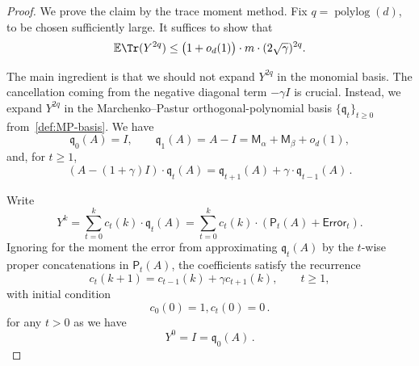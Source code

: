 \documentclass[12pt]{article}
\def \E {\mathbb{E}}
\def \al {\alpha}
\newcommand{\polylog}{\operatorname{polylog}}
\newcommand{\cm}{\mathsf{M} }
\newcommand{\fp}{\mathsf{P}}
\newcommand{\q}{\mathfrak q}
\newcommand{\Authornote}[3]{{\sf\footnotesize\color{#3}{[#1: #2]}}}
\newcommand{\Authornote}[3]{}
\newcommand{\jnote}[1]{\Authornote{Jeff}{#1}{blue}}
\begin{document}
\begin{proof}
	
We prove the claim by the trace moment method. Fix
\(q=\polylog(d)\), to be chosen sufficiently large. It suffices to show that
\[
    \E\Tr(Y^{2q})
    \le
    \bigl(1+o_d(1)\bigr) \cdot  m \cdot (2\sqrt{\gamma})^{2q}.
\]


The main ingredient is that we should not expand \(Y^{2q}\) in the 
monomial basis. The cancellation coming from the negative diagonal term
\(-\gamma I\) is crucial. Instead, we expand \(Y^{2q}\) in the Marchenko–Pastur orthogonal-polynomial basis \(\{\q_t\}_{t\ge0}\) from~\cref{def:MP-basis}. We have \[
    \q_0(A)=I,
    \qquad
    \q_1(A)=A- I=\cm_\al + \cm_\beta + o_d(1),
\]
and, for \(t\ge1\),
\[
    (A - (1+\gamma) I)  \cdot  \q_t(A)
    =
    \q_{t+1}(A)+\gamma  \cdot \q_{t-1}(A)\,.\]

Write
\[
    Y^k
    =
    \sum_{t=0}^{k} c_t(k) \cdot \q_t(A)  = \sum_{t=0}^k c_t(k) \cdot \left(\fp_t(A)+ \mathsf{Error}_t\right).
\]
Ignoring for the moment the error from approximating $\q_t(A)$ by the $t$-wise proper concatenations in $\fp_t(A)$, the coefficients
satisfy the recurrence
\[
    c_t(k+1)
    =
    c_{t-1}(k)+\gamma c_{t+1}(k),
    \qquad t\ge1,
\]
with
initial condition
\[
    c_0(0)=1,
    c_t(0) =0 \,.
\]
for any $t>0$ as we have \[ 
Y^0 = I = \q_0(A) \,.
\]



\end{proof}
\end{document}
